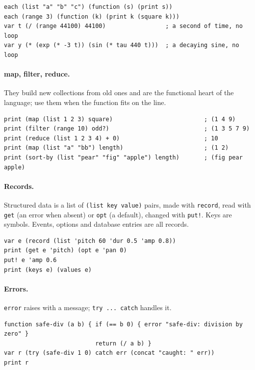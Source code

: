 \documentclass[11pt,a4paper]{article}
\newcommand{\musil}[1]{\lstinline[style=musilinline]{#1}}
\begin{document}
\begin{lstlisting}
each (list "a" "b" "c") (function (s) (print s))
each (range 3) (function (k) (print k (square k)))
var t (/ (range 44100) 44100)                 ; a second of time, no loop
var y (* (exp (* -3 t)) (sin (* tau 440 t)))  ; a decaying sine, no loop
\end{lstlisting}

\paragraph{map, filter, reduce.} They build new collections from old ones and are the
functional heart of the language; use them when the function fits on the line.

\begin{lstlisting}
print (map (list 1 2 3) square)                          ; (1 4 9)
print (filter (range 10) odd?)                           ; (1 3 5 7 9)
print (reduce (list 1 2 3 4) + 0)                        ; 10
print (map (list "a" "bb") length)                       ; (1 2)
print (sort-by (list "pear" "fig" "apple") length)       ; (fig pear apple)
\end{lstlisting}

\paragraph{Records.} Structured data is a list of \musil{(list key value)} pairs, made with
\musil{record}, read with \musil{get} (an error when absent) or \musil{opt} (a default),
changed with \musil{put!}. Keys are symbols. Events, options and database entries are all
records.

\begin{lstlisting}
var e (record (list 'pitch 60 'dur 0.5 'amp 0.8))
print (get e 'pitch) (opt e 'pan 0)
put! e 'amp 0.6
print (keys e) (values e)
\end{lstlisting}

\paragraph{Errors.} \musil{error} raises with a message; \musil{try ... catch} handles it.

\begin{lstlisting}
function safe-div (a b) { if (== b 0) { error "safe-div: division by zero" }
                          return (/ a b) }
var r (try (safe-div 1 0) catch err (concat "caught: " err))
print r
\end{lstlisting}
\end{document}
